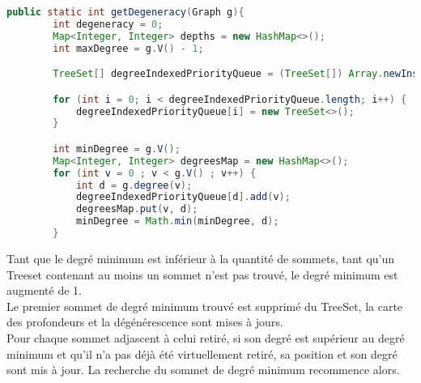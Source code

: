 \begin{lstlisting}[language=java]
public static int getDegeneracy(Graph g){
        int degeneracy = 0;
        Map<Integer, Integer> depths = new HashMap<>();
        int maxDegree = g.V() - 1;

        TreeSet[] degreeIndexedPriorityQueue = (TreeSet[]) Array.newInstance(TreeSet.class, maxDegree + 1);

        for (int i = 0; i < degreeIndexedPriorityQueue.length; i++) {
            degreeIndexedPriorityQueue[i] = new TreeSet<>();
        }

        int minDegree = g.V();
        Map<Integer, Integer> degreesMap = new HashMap<>();
        for (int v = 0 ; v < g.V() ; v++) {
            int d = g.degree(v);
            degreeIndexedPriorityQueue[d].add(v);
            degreesMap.put(v, d);
            minDegree = Math.min(minDegree, d);
        }
\end{lstlisting}
Tant que le degré minimum est inférieur à la quantité de sommets, tant qu'un Treeset contenant au moins un sommet n'est pas trouvé, le degré minimum est augmenté de 1. \\
Le premier sommet de degré minimum trouvé est supprimé du TreeSet, la carte des profondeurs et la dégénérescence sont mises à jours. \\
Pour chaque sommet adjascent à celui retiré, si son degré est supérieur au degré minimum et qu'il n'a pas déjà été virtuellement retiré, sa position et son degré sont mis à jour.
La recherche du sommet de degré minimum recommence alors.
